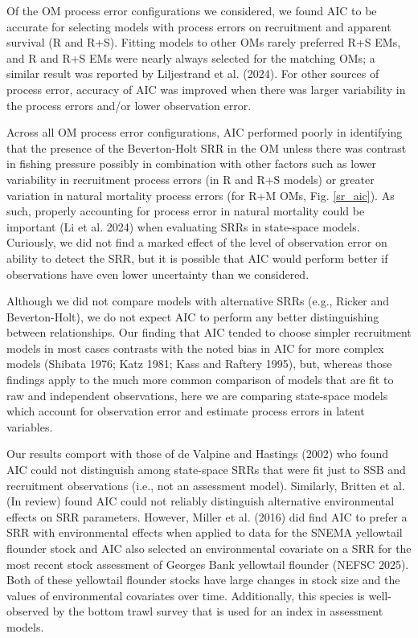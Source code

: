 \documentclass[
  12pt,
]{article}
\begin{document}
Of the OM process error configurations we considered, we found AIC to be
accurate for selecting models with process errors on recruitment and
apparent survival (R and R+S). Fitting models to other OMs rarely
preferred R+S EMs, and R and R+S EMs were nearly always selected for the
matching OMs; a similar result was reported by Liljestrand et al.
(2024). For other sources of process error, accuracy of AIC was improved
when there was larger variability in the process errors and/or lower
observation error.

Across all OM process error configurations, AIC performed poorly in
identifying that the presence of the Beverton-Holt SRR in the OM unless
there was contrast in fishing pressure possibly in combination with
other factors such as lower variability in recruitment process errors
(in R and R+S models) or greater variation in natural mortality process
errors (for R+M OMs, Fig. \ref{sr_aic}). As such, properly accounting
for process error in natural mortality could be important (Li et al.
2024) when evaluating SRRs in state-space models. Curiously, we did not
find a marked effect of the level of observation error on ability to
detect the SRR, but it is possible that AIC would perform better if
observations have even lower uncertainty than we considered.

Although we did not compare models with alternative SRRs (e.g., Ricker
and Beverton-Holt), we do not expect AIC to perform any better
distinguishing between relationships. Our finding that AIC tended to
choose simpler recruitment models in most cases contrasts with the noted
bias in AIC for more complex models (Shibata 1976; Katz 1981; Kass and
Raftery 1995), but, whereas those findings apply to the much more common
comparison of models that are fit to raw and independent observations,
here we are comparing state-space models which account for observation
error and estimate process errors in latent variables.

Our results comport with those of de Valpine and Hastings (2002) who
found AIC could not distinguish among state-space SRRs that were fit
just to SSB and recruitment observations (i.e., not an assessment
model). Similarly, Britten et al. (In review) found AIC could not
reliably distinguish alternative environmental effects on SRR
parameters. However, Miller et al. (2016) did find AIC to prefer a SRR
with environmental effects when applied to data for the SNEMA yellowtail
flounder stock and AIC also selected an environmental covariate on a SRR
for the most recent stock assessment of Georges Bank yellowtail flounder
(NEFSC 2025). Both of these yellowtail flounder stocks have large
changes in stock size and the values of environmental covariates over
time. Additionally, this species is well-observed by the bottom trawl
survey that is used for an index in assessment models.
\end{document}
